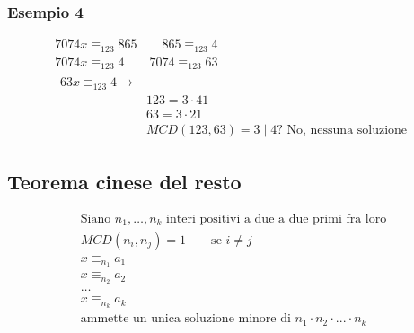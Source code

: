 \documentclass[italian]{article}
\begin{document}
\subsubsection{Esempio 4}
\begin{gather*}
	7074x \equiv_{123} 865 \qquad 865 \equiv_{123} 4\\
	7074x \equiv_{123} 4 \qquad 7074 \equiv_{123} 63 \\
	\begin{split}
		63x \equiv_{123} 4 \to & \\
		& 123 = 3\cdot 41 \\
		& 63 = 3 \cdot 21 \\
		& MCD(123,63) = 3 \;|\; 4 \text{? No, nessuna soluzione}
	\end{split}
\end{gather*}


\newpage
\subsection{Teorema cinese del resto}
\begin{gather*}
	\text{Siano $n_1, \dots, n_k$ interi positivi a due a due primi fra loro}\\
	MCD(n_i, n_j)=1 \qquad \text{se } i\neq j\\
	x \equiv_{n_1} a_1 \\
	x \equiv_{n_2} a_2 \\
	\dots\\
	x \equiv_{n_k} a_k\\
	\text{ammette un unica soluzione minore di $n_1 \cdot n_2 \cdot ... \cdot n_k$}
\end{gather*}
\end{document}
